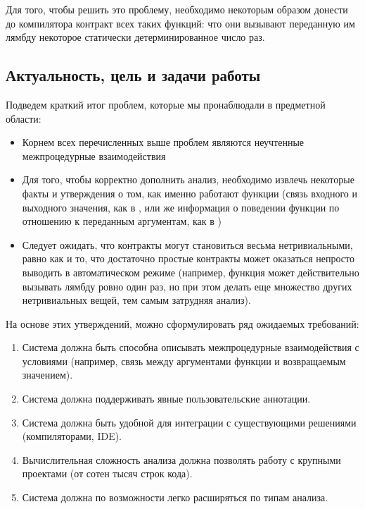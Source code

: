 Для того, чтобы решить это проблему, необходимо некоторым образом донести до компилятора контракт всех таких функций: что они вызывают переданную им лямбду некоторое статически детерминированное число раз. 





\subsection{Актуальность, цель и задачи работы}

Подведем краткий итог проблем, которые мы пронаблюдали в предметной области:

\begin{itemize}
    \item Корнем всех перечисленных выше проблем являются неучтенные межпроцедурные взаимодействия
    
    \item Для того, чтобы корректно дополнить анализ, необходимо извлечь некоторые факты и утверждения о том, как именно работают функции (связь входного и выходного значения, как в , или же информация о поведении функции по отношению к переданным аргументам, как в )
    
    \item Следует ожидать, что контракты могут становиться весьма нетривиальными, равно как и то, что достаточно простые контракты может оказаться непросто выводить в автоматическом режиме (например, функция может действительно вызывать лямбду ровно один раз, но при этом делать еще множество других нетривиальных вещей, тем самым затрудняя анализ).
\end{itemize}

На основе этих утверждений, можно сформулировать ряд ожидаемых требований:

\begin{enumerate}
	\item Система должна быть способна описывать межпроцедурные взаимодействия с условиями (например, связь между аргументами функции и возвращаемым значением).
	
	\item Система должна поддерживать явные пользовательские аннотации.
	
	\item Система должна быть удобной для интеграции с существующими решениями (компиляторами, IDE).
	
	\item Вычислительная сложность анализа должна позволять работу с крупными проектами (от сотен тысяч строк кода).
	
	\item Система должна по возможности легко расширяться по типам анализа.
\end{enumerate}

